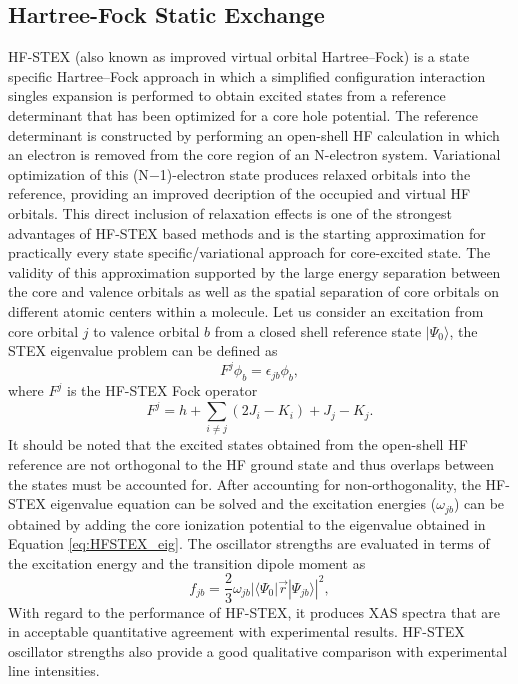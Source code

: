 \documentclass{article}
\begin{document}
\subsection{Hartree-Fock Static Exchange}
HF-STEX (also known as improved virtual orbital Hartree--Fock) is a state specific Hartree--Fock approach in which a simplified configuration interaction singles expansion is performed to obtain excited states from a reference determinant that has been optimized for a core hole potential.\cite{agren_direct_1994,hunt_excited_1969,zhang_nonlinear_2014,agren_direct_1997} The reference determinant is constructed by performing an open-shell HF calculation in which an electron is removed from the core region of an N-electron system. Variational optimization of this (N$-$1)-electron state produces relaxed orbitals into the reference, providing an improved decription of the occupied and virtual HF orbitals. This direct inclusion of relaxation effects is one of the strongest advantages of HF-STEX based methods and is the starting approximation for practically every state specific/variational approach for core-excited state. The validity of this approximation supported by the large energy separation between the core and valence orbitals as well as the spatial separation of core orbitals on different atomic centers within a molecule. Let us consider an excitation from core orbital $j$ to valence orbital $b$ from a closed shell reference state $|\Psi_0\rangle$, the STEX eigenvalue problem can be defined as
\begin{equation}
\label{eq:HFSTEX_eig}
F^j \phi_b = \epsilon_{jb} \phi_b,
\end{equation}
where $F^j$ is the HF-STEX Fock operator
\begin{equation}
F^j = h + \sum_{i \neq j} (2J_i - K_i) + J_j - K_j.
\end{equation}
It should be noted that the excited states obtained from the open-shell HF reference are not orthogonal to the HF ground state and thus overlaps between the states must be accounted for. After accounting for non-orthogonality, the HF-STEX eigenvalue equation can be solved and the excitation energies ($\omega_{jb}$) can be obtained by adding the core ionization potential to the eigenvalue obtained in Equation \ref{eq:HFSTEX_eig}. The oscillator strengths are evaluated in terms of the excitation energy and the transition dipole moment as
\begin{equation}
f_{jb} = \frac{2}{3} \omega_{jb}|\langle \Psi_0|\vec{r}|\Psi_{jb}\rangle|^2,
\end{equation}
With regard to the performance of HF-STEX, it produces XAS spectra that are in acceptable quantitative agreement with experimental results. HF-STEX oscillator strengths also provide a good qualitative comparison with experimental line intensities.
\end{document}
